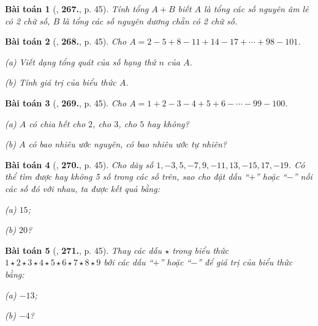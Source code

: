 \documentclass{article}
\numberwithin{equation}{section}
\newtheorem{baitoan}{Bài toán}
\begin{document}
\begin{baitoan}[\cite{Binh_Toan_6_tap_1}, \textbf{267.}, p. 45]
	Tính tổng $A + B$ biết $A$ là tổng các số nguyên âm lẻ có 2 chữ số, $B$ là tổng các số nguyên dương chẵn có 2 chữ số.
\end{baitoan}

\begin{baitoan}[\cite{Binh_Toan_6_tap_1}, \textbf{268.}, p. 45]
	Cho $A = 2 - 5 + 8 - 11 + 14 - 17 + \cdots + 98 - 101$.
	\begin{enumerate*}
		\item[(a)] Viết dạng tổng quát của số hạng thứ $n$ của $A$.
		\item[(b)] Tính giá trị của biểu thức $A$.
	\end{enumerate*}
\end{baitoan}

\begin{baitoan}[\cite{Binh_Toan_6_tap_1}, \textbf{269.}, p. 45]
	Cho $A = 1 + 2 - 3 - 4 + 5 + 6 - \cdots - 99 - 100$.
	\begin{enumerate*}
		\item[(a)] $A$ có chia hết cho $2$, cho $3$, cho $5$ hay không?
		\item[(b)] $A$ có bao nhiêu ước nguyên, có bao nhiêu ước tự nhiên?
	\end{enumerate*}
\end{baitoan}

\begin{baitoan}[\cite{Binh_Toan_6_tap_1}, \textbf{270.}, p. 45]
	Cho dãy số $1,-3,5,-7,9,-11,13,-15,17,-19$. Có thể tìm được hay không 5 số trong các số trên, sao cho đặt dấu ``$+$'' hoặc ``$-$'' nối các số đó với nhau, ta được kết quả bằng:
	\begin{enumerate*}
		\item[(a)] $15$;
		\item[(b)] $20$?
	\end{enumerate*}
\end{baitoan}

\begin{baitoan}[\cite{Binh_Toan_6_tap_1}, \textbf{271.}, p. 45]
	Thay các dấu  $\star$ trong biểu thức $1\star2\star3\star4\star5\star6\star7\star8\star9$ bởi các dấu ``$+$'' hoặc ``$-$'' để giá trị của biểu thức bằng:
	\begin{enumerate*}
		\item[(a)] $-13$;
		\item[(b)] $-4$?
	\end{enumerate*}
\end{baitoan}
\end{document}
